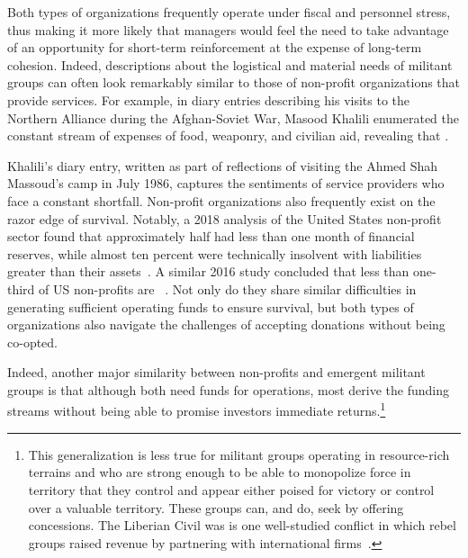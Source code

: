 Both types of organizations frequently operate under fiscal and personnel stress, thus making it more likely that managers would feel the need to take advantage of an opportunity for short-term reinforcement at the expense of long-term cohesion. Indeed, descriptions about the logistical and material needs of militant groups can often look remarkably similar to those of non-profit organizations that provide services. For example, in diary entries describing his visits to the Northern Alliance during the Afghan-Soviet War, Masood Khalili enumerated the constant stream of expenses of food, weaponry, and civilian aid, revealing that \autocite[129]{khalili2017whispers}.

Khalili's diary entry, written as part of reflections of visiting the Ahmed Shah Massoud's camp in July 1986, captures the sentiments of service providers who face a constant shortfall.  Non-profit organizations also frequently exist on the razor edge of survival.  Notably, a 2018 analysis of the United States non-profit sector found that approximately half had less than one month of financial reserves, while almost ten percent were technically insolvent with liabilities greater than their assets~\autocite{morse2018financial}. A similar 2016 study concluded that less than one-third of US non-profits are ~\autocite{roberts2016risk}. Not only do they share similar difficulties in generating sufficient operating funds to ensure survival, but both types of organizations also navigate the challenges of accepting donations without being co-opted. 

Indeed, another major similarity between non-profits and emergent militant groups is that although both need funds for operations, most derive the funding streams without being able to promise investors immediate returns.\footnote{This generalization is less true for militant groups operating in resource-rich terrains and who are strong enough to be able to monopolize force in territory that they control and appear either poised for victory or control over a valuable territory. These groups can, and do, seek  by offering concessions. The Liberian Civil was is one well-studied conflict in which rebel groups raised revenue by partnering with international firms~\autocite{lidow2016violent}.} %


